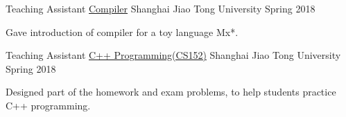 \begin{cventries}

    \cventry
    {Teaching Assistant}
	{\href{https://acm.sjtu.edu.cn/wiki/Compiler_2019}{Compiler}}
	{Shanghai Jiao Tong University}
	{Spring 2018}
	{\begin{cvitems}
        \item {Gave introduction of compiler for a toy language Mx*.}
    \end{cvitems}
    }
    
    \cventry
    {Teaching Assistant}
	{\href{https://acm.sjtu.edu.cn/wiki/Programming_2017}{C++ Programming(CS152)}}
	{Shanghai Jiao Tong University}
	{Spring 2018}
	{\begin{cvitems}
        \item {Designed part of the homework and exam problems, to help students practice C++ programming}.
    \end{cvitems}}
\end{cventries}